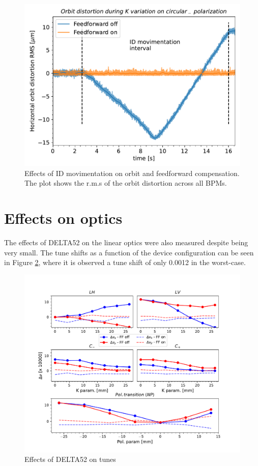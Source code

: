 \documentclass[a4paper,
               keeplastbox,   %
               ]{jacow}
\begin{document}
\begin{figure}[!h]
    \centering
   \includegraphics[width=0.75\columnwidth]{Orbit_dist_FAcq.pdf}
   \caption{Effects of ID movimentation on orbit and feedforward compensation. The plot shows the r.m.s of the orbit distortion across all BPMs.}
   \label{fig:orbit_fast}
\end{figure}

\section{Effects on optics}

The effects of DELTA52 on the linear optics were also measured despite being very small. The tune shifts as a function of the device configuration can be seen in Figure \ref{fig:tunes}, where it is observed a tune shift of only 0.0012 in the worst-case.

\begin{figure}[!h]
    \centering
   \includegraphics[width=\columnwidth]{Tune_deviation.pdf}
   \caption{Effects of DELTA52 on tunes}
   \label{fig:tunes}
\end{figure}
\end{document}
